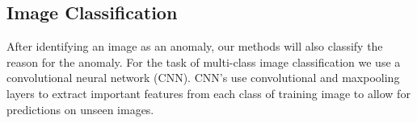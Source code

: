 \subsection{Image Classification}

After identifying an image as an anomaly, our methods will also classify the reason for the anomaly. For the task of multi-class image classification we use a convolutional neural network (CNN). CNN's use convolutional and maxpooling layers to extract important features from each class of training image to allow for predictions on unseen images. 